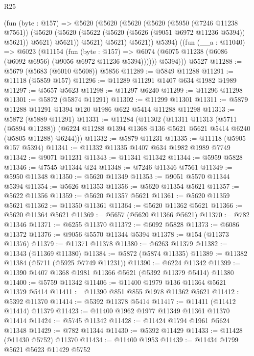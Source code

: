 \begin{lexlean}{R25}
\begin{coremodule}
          (fun (byte : @157) =>
          @5620
            (@5620
              (@5620
                (@5620
                  (@5950 (@7246 @11238 @7561))
                  (@5620
                    (@5620 (@5622 (@5620 (@5626 (@9051 @6972 @11236 @5394)) @5621)) @5621)
                    @5621))
                @5621)
              @5621)
            @5621))
          @5394)
        ((fun (__a : @11040) =>
        @6023
          (@11154
            (fun (byte : @157) =>
            @6074 (@6075 @11238 (@6086 (@6092 @6956) (@9056 @6972 @11236 @5394))))))
          @5394)))
    @5527
@11288 := @5679 (@5683 (@6010 @5608)) @5856
@11289 := @5849 @11288
@11291 := @11118 (@5859 @157)
@11296 := @11289 @11291 @1407 @634 @1982 @1989
@11297 := @5657 @5623
@11298 := @11297 @6240
@11299 := @11296 @11298
@11301 := @5872 (@5874 @11291)
@11302 := @11299 @11301
@11311 := @5879 @11288 @11291 @1394 @120 @1986 @622 @5414 @11288 @11298
@11313 := @5872 (@5889 @11291)
@11331 := @11284
    (@11302
      (@11311
        @11313
        (@5711 (@5894 @11288))
        (@6224 @11288 @1394 @1368 @136 @5621 @5621 @5414 @6240 (@5805 @11288) @6244)))
@11332 := @5879 @11231
@11335 := @11118 (@5905 @157 @5394)
@11341 := @11332 @11335 @1407 @634 @1982 @1989 @7749
@11342 := @9071 @11231
@11343 := @11341 @11342
@11344 := @5959 @5828
@11346 := @7545 @11344 @24
@11348 := @7246 @11346 @7561
@11349 := @5950 @11348
@11350 := @5620 @11349
@11353 := @9051 @5570 @11344 @5394
@11354 := @5626 @11353
@11356 := @5620 @11354 @5621
@11357 := @5622 @11356
@11359 := @5620 @11357 @5621
@11361 := @5620 @11359 @5621
@11362 := @11350 @11361
@11364 := @5620 @11362 @5621
@11366 := @5620 @11364 @5621
@11369 := @5657 (@5620 @11366 @5621)
@11370 := @782 @11346
@11371 := @6255 @11370
@11372 := @6092 @5828
@11373 := @6086 @11372
@11376 := @9056 @5570 @11344 @5394
@11378 := @154 (@11373 @11376)
@11379 := @11371 @11378
@11380 := @6263 @11379
@11382 := @11343 (@11369 @11380)
@11384 := @5872 (@5874 @11335)
@11389 := @11382 @11384 (@5711 (@5925 @7749 @11231))
@11390 := @6224 @11342
@11399 := @11390 @1407 @1368 @1981 @11366 @5621 (@5392 @11379 @5414) @11380
@11400 := @5759 @11342
@11406 := @11400 @1979 @136 @11364 @5621 @11379 @5414
@11411 := @11390 @851 @855 @1978 @11362 @5621
@11412 := @5392 @11370
@11414 := @5392 @11378 @5414
@11417 := @11411 (@11412 @11414) @11379
@11423 := @11400 @1962 @1977 @11349 @11361 @11370 @11414
@11424 := @5745 @11342
@11428 := @11424 @1794 @1961 @5624 @11348
@11429 := @782 @11344
@11430 := @5392 @11429
@11433 := @11428 (@11430 @5752) @11370
@11434 := @11400 @1953
@11439 := @11434 @1799 @5621 @5623 @11429 @5752

\end{coremodule}
\end{lexlean}
